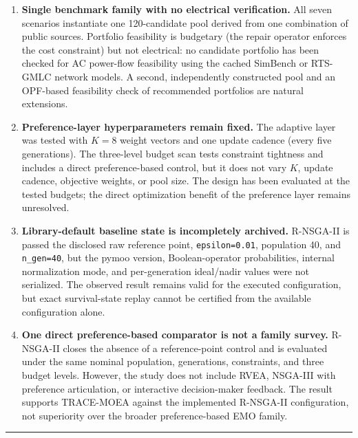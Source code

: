 \documentclass[
  10pt,
  a4paper,
]{article}
\begin{document}
\begin{enumerate}
  speed, stakeholder contestability, or regulatory compliance requires a
  human-subjects study that has not been performed.
\item
  \textbf{Single benchmark family with no electrical verification.} All
  seven scenarios instantiate one 120-candidate pool derived from one
  combination of public sources. Portfolio feasibility is budgetary (the
  repair operator enforces the cost constraint) but not electrical: no
  candidate portfolio has been checked for AC power-flow feasibility
  using the cached SimBench or RTS-GMLC network models. A second,
  independently constructed pool and an OPF-based feasibility check of
  recommended portfolios are natural extensions.
\item
  \textbf{Preference-layer hyperparameters remain fixed.} The adaptive
  layer was tested with \(K=8\) weight vectors and one update cadence
  (every five generations). The three-level budget scan tests constraint
  tightness and includes a direct preference-based control, but it does
  not vary \(K\), update cadence, objective weights, or pool size. The
  design has been evaluated at the tested budgets; the direct
  optimization benefit of the preference layer remains unresolved.
\item
  \textbf{Library-default baseline state is incompletely archived.}
  R-NSGA-II is passed the disclosed raw reference point,
  \texttt{epsilon=0.01}, population 40, and \texttt{n\_gen=40}, but the
  pymoo version, Boolean-operator probabilities, internal normalization
  mode, and per-generation ideal/nadir values were not serialized. The
  observed result remains valid for the executed configuration, but
  exact survival-state replay cannot be certified from the available
  configuration alone.
\item
  \textbf{One direct preference-based comparator is not a family
  survey.} R-NSGA-II closes the absence of a reference-point control and
  is evaluated under the same nominal population, generations,
  constraints, and three budget levels. However, the study does not
  include RVEA, NSGA-III with preference articulation, or interactive
  decision-maker feedback. The result supports TRACE-MOEA against the
  implemented R-NSGA-II configuration, not superiority over the broader
  preference-based EMO family.
\end{enumerate}

\begin{center}\rule{0.5\linewidth}{0.5pt}\end{center}
\end{document}
